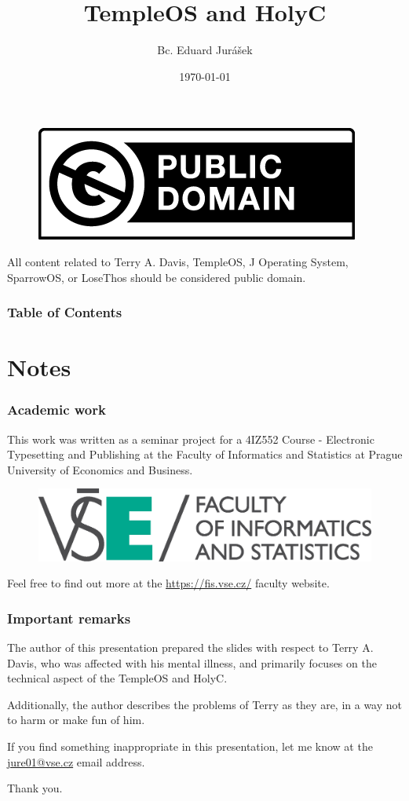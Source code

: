 \documentclass{beamer}
\title{TempleOS and HolyC}
\author{Bc. Eduard Jurášek}
\institute{ FIS VŠE, Prague }
\date{\today}
\begin{document}
	\begin{frame}
		\titlepage

		\begin{figure}
			\centering
			\includegraphics[width=0.2\linewidth]{images/publicdomain.png}
		\end{figure}
		All content related to Terry A. Davis, TempleOS, J Operating System,
		SparrowOS, or LoseThos should be considered public domain.
	\end{frame}

	\begin{frame}
		\frametitle{Table of Contents}
		\begin{multicols}{3}
			\tableofcontents
		\end{multicols}
	\end{frame}

	\section{Notes}
	\begin{frame}
		\frametitle{Academic work}
		This work was written as a seminar project for a 4IZ552 Course - Electronic Typesetting
		and Publishing at the Faculty of Informatics and Statistics at Prague University
		of Economics and Business.
		\begin{figure}
			\centering
			\includegraphics[width=0.5\linewidth]{images/FIS_1_logo_cmyk.eps}
		\end{figure}
		Feel free to find out more at the \url{https://fis.vse.cz/} faculty website.
	\end{frame}
	\begin{frame}
		\frametitle{Important remarks}
		The author of this presentation prepared the slides with respect to Terry A.
		Davis, who was affected with his mental illness, and primarily focuses on
		the technical aspect of the TempleOS and HolyC.

		Additionally, the author describes the problems of Terry as they are, in a
		way not to harm or make fun of him.

		If you find something inappropriate in this presentation, let me know at the \href{mailto:jure01@vse.cz}{jure01@vse.cz}
		email address.

		Thank you.
	\end{frame}
\end{document}
